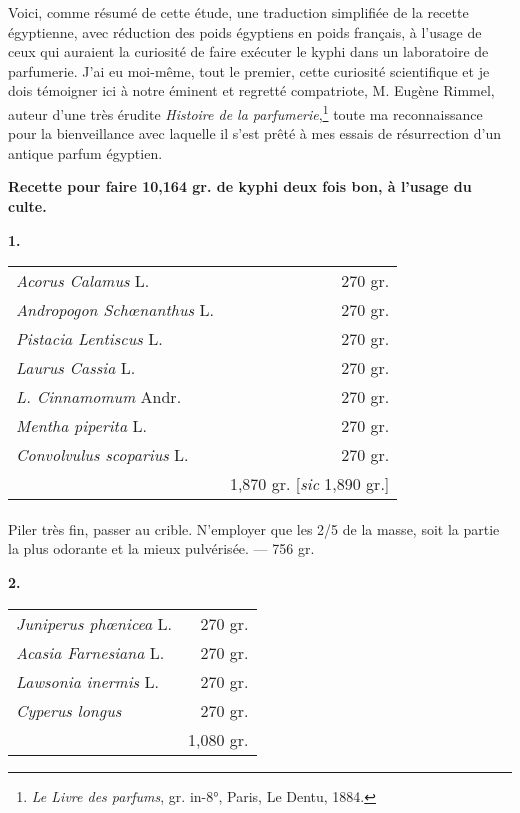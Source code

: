 \documentclass[a4paper, 11pt, oneside]{article}
\begin{document}
Voici, comme résumé de cette étude, une traduction simplifiée de la recette égyptienne, avec réduction des poids égyptiens en poids français, à l'usage de ceux qui auraient la curiosité de faire exécuter le kyphi dans un laboratoire de parfumerie. J'ai eu moi-même, tout le premier, cette curiosité scientifique et je dois témoigner ici à notre éminent et regretté compatriote, M. Eugène Rimmel, auteur d'une très érudite \emph{Histoire de la parfumerie},\footnote{\emph{Le Livre des parfums}, gr. in-8°, Paris, Le Dentu, 1884.} toute ma reconnaissance pour la bienveillance avec laquelle il s'est prêté à mes essais de résurrection d'un antique parfum égyptien.

\begin{center}
\textbf{Recette pour faire 10,164 gr. de kyphi deux fois bon, à l'usage du culte.}
\end{center}
\begin{center}
\textbf{1.}
\end{center}
\begin{table}[H]
    \centering
    \begin{tabular}{l r}
        \emph{Acorus Calamus} L.  &  270 gr. \\
        \emph{Andropogon Schœnanthus} L.  &  270 gr. \\
        \emph{Pistacia Lentiscus} L.  &  270 gr. \\
        \emph{Laurus Cassia} L.  &  270 gr. \\
        \emph{L. Cinnamomum} Andr.  &  270 gr. \\
        \emph{Mentha piperita} L.  &  270 gr. \\
        \emph{Convolvulus scoparius} L.  &  270 gr. \\ \hline
        ~ & 1,870 gr. [\emph{sic} 1,890 gr.] \\
    \end{tabular}
\end{table}
\paragraph{}
Piler très fin, passer au crible. N'employer que les 2/5 de la masse, soit la partie la plus odorante et la mieux pulvérisée. --- 756 gr.
\begin{center}
\textbf{2.}
\end{center}
\begin{table}[H]
    \centering
    \begin{tabular}{l r}
        \emph{Juniperus phœnicea} L.  &  270 gr. \\
        \emph{Acasia Farnesiana} L.  &  270 gr. \\
        \emph{Lawsonia inermis} L.  &  270 gr. \\
        \emph{Cyperus longus}  &  270 gr. \\ \hline
        ~ & 1,080 gr. \\
    \end{tabular}
\end{table}
\end{document}
